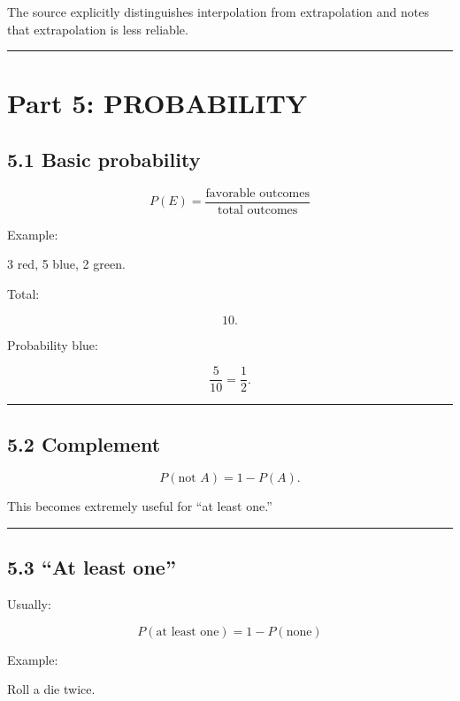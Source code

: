 \documentclass[
]{article}
\newcounter{none} %
\begin{document}
The source explicitly distinguishes interpolation from extrapolation and
notes that extrapolation is less reliable.

\begin{center}\rule{0.5\linewidth}{0.5pt}\end{center}

\section{Part 5: PROBABILITY}\label{part-5-probability}

\subsection{5.1 Basic probability}\label{basic-probability}

\[
\boxed{
P(E)=
\frac{\text{favorable outcomes}}
{\text{total outcomes}}
}
\]

Example:

3 red, 5 blue, 2 green.

Total:

\[
10.
\]

Probability blue:

\[
\frac5{10}
=
\boxed{\frac12}.
\]

\begin{center}\rule{0.5\linewidth}{0.5pt}\end{center}

\subsection{5.2 Complement}\label{complement}

\[
\boxed{P(\text{not }A)=1-P(A)}.
\]

This becomes extremely useful for ``at least one.''

\begin{center}\rule{0.5\linewidth}{0.5pt}\end{center}

\subsection{5.3 ``At least one''}\label{at-least-one}

Usually:

\[
\boxed{
P(\text{at least one})
=
1-P(\text{none})
}
\]

Example:

Roll a die twice.
\end{document}
